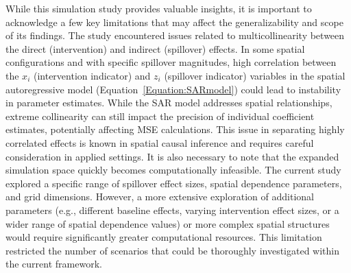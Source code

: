 \documentclass{article}[11pt]
\begin{document}
While this simulation study provides valuable insights, it is important to acknowledge a few key limitations that may affect the generalizability and scope of its findings. The study encountered issues related to multicollinearity between the direct (intervention) and indirect (spillover) effects. In some spatial configurations and with specific spillover magnitudes, high correlation between the $x_i$ (intervention indicator) and $z_i$ (spillover indicator) variables in the spatial autoregressive model (Equation~\ref{Equation:SARmodel}) could lead to instability in parameter estimates. While the SAR model addresses spatial relationships, extreme collinearity can still impact the precision of individual coefficient estimates, potentially affecting MSE calculations. This issue in separating highly correlated effects is known in spatial causal inference and requires careful consideration in applied settings. It is also necessary to note that the expanded simulation space quickly becomes computationally infeasible. The current study explored a specific range of spillover effect sizes, spatial dependence parameters, and grid dimensions. However, a more extensive exploration of additional parameters (e.g., different baseline effects, varying intervention effect sizes, or a wider range of spatial dependence values) or more complex spatial structures would require significantly greater computational resources. This limitation restricted the number of scenarios that could be thoroughly investigated within the current framework.
\end{document}
